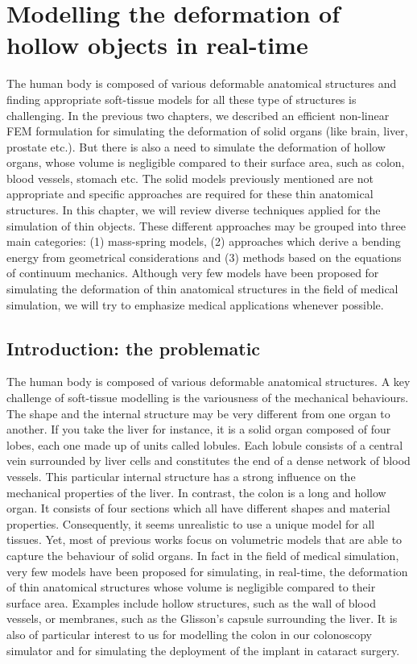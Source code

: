 \chapter{Modelling the deformation of hollow objects in real-time}
\label{chap7}
\begin{shortAbstract}
The human body is composed of various deformable anatomical structures and finding appropriate soft-tissue models for all these type of structures is challenging. In the previous two chapters, we described an efficient non-linear FEM formulation for simulating the deformation of solid organs (like brain, liver, prostate etc.). But there is also a need to simulate the deformation of hollow organs, whose volume is negligible compared to their surface area, such as colon, blood vessels, stomach etc. The solid models previously mentioned are not appropriate and specific approaches are required for these thin anatomical structures. In this chapter, we will review diverse techniques applied for the simulation of thin objects. These different approaches may be grouped into three main categories: (1) mass-spring models, (2) approaches which derive a bending energy from geometrical considerations and (3) methods based on the equations of continuum mechanics. Although very few models have been proposed for simulating the deformation of thin anatomical structures in the field of medical simulation, we will try to emphasize medical applications whenever possible. 
\end{shortAbstract}


\section{Introduction: the problematic}
The human body is composed of various deformable anatomical structures. A key challenge of soft-tissue modelling is the variousness of the mechanical behaviours. The shape and the internal structure may be very different from one organ to another. If you take the liver for instance, it is a solid organ composed of four lobes, each one made up of units called lobules. Each lobule consists of a central vein surrounded by liver cells and constitutes the end of a dense network of blood vessels. This particular internal structure has a strong influence on the mechanical properties of the liver. In contrast, the colon is a long and hollow organ. It consists of four sections which all have different shapes and material properties. Consequently, it seems unrealistic to use a unique model for all tissues. Yet, most of previous works focus on volumetric models that are able to capture the behaviour of solid organs. In fact in the field of medical simulation, very few models have been proposed for simulating, in real-time, the deformation of thin anatomical structures whose volume is negligible compared to their surface area. Examples include hollow structures, such as the wall of blood vessels, or membranes, such as the Glisson's capsule surrounding the liver. It is also of particular interest to us for modelling the colon in our colonoscopy simulator and for simulating the deployment of the implant in cataract surgery. 

